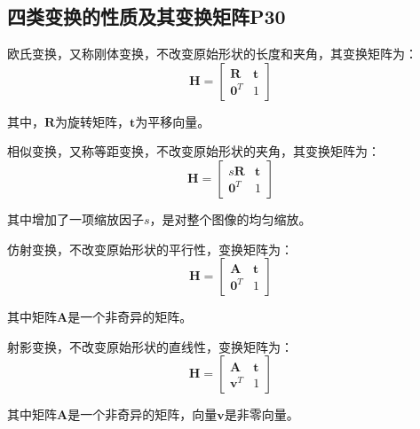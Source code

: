 \documentclass[11pt]{article}
\begin{document}
\subsection{四类变换的性质及其变换矩阵P30}
欧氏变换，又称刚体变换，不改变原始形状的长度和夹角，其变换矩阵为：
\begin{equation*}
  \mathbold{H}=\begin{bmatrix}
    \mathbold{R}   & \mathbold{t} \\
    \mathbold{0}^T & 1
  \end{bmatrix}
\end{equation*}\par
其中，$\mathbold{R}$为旋转矩阵，$\mathbold{t}$为平移向量。\par
相似变换，又称等距变换，不改变原始形状的夹角，其变换矩阵为：
\begin{equation*}
  \mathbold{H}=\begin{bmatrix}
    s\mathbold{R}  & \mathbold{t} \\
    \mathbold{0}^T & 1
  \end{bmatrix}
\end{equation*}\par
其中增加了一项缩放因子$s$，是对整个图像的均匀缩放。\par
仿射变换，不改变原始形状的平行性，变换矩阵为：
\begin{equation*}
  \mathbold{H}=\begin{bmatrix}
    \mathbold{A}   & \mathbold{t} \\
    \mathbold{0}^T & 1
  \end{bmatrix}
\end{equation*}\par
其中矩阵$\mathbold{A}$是一个非奇异的矩阵。\par
射影变换，不改变原始形状的直线性，变换矩阵为：
\begin{equation*}
  \mathbold{H}=\begin{bmatrix}
    \mathbold{A}   & \mathbold{t} \\
    \mathbold{v}^T & 1
  \end{bmatrix}
\end{equation*}\par
其中矩阵$\mathbold{A}$是一个非奇异的矩阵，向量$\mathbold{v}$是非零向量。
\end{document}

